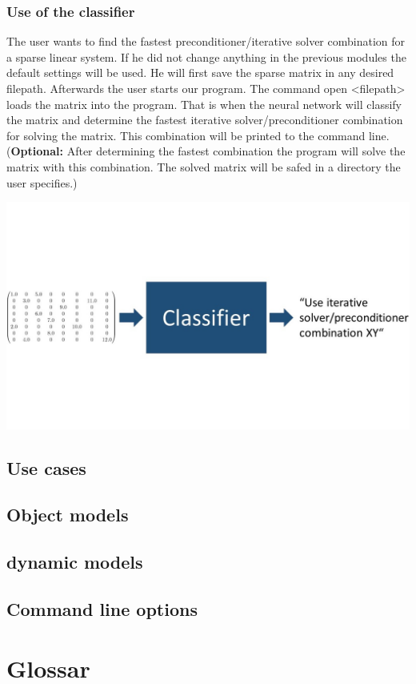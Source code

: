 \documentclass[parskip=full]{scrartcl}
\begin{document}
\subsubsection{Use of the classifier}

The user wants to find the fastest preconditioner/iterative solver combination for a sparse linear system. If he did not change anything in the previous modules the default settings will be used. He will first save the sparse matrix in any desired filepath. Afterwards the user starts our program. The command open <filepath> loads the matrix into the program. That is when the neural network will classify the matrix and determine the fastest iterative solver/preconditioner combination for solving the matrix. This combination will be printed to the command line. (\textbf{Optional:} After determining the fastest combination the program will solve the matrix with this combination. The solved matrix will be safed in a directory the user specifies.)
\begin{center}
\includegraphics[width=\textwidth]{classifier}
\end{center}


\subsection{Use cases}
\subsection{Object models}
\subsection{dynamic models}
\subsection{Command line options}
\clearpage

\section{Glossar}

%
\printnoidxglossaries
\end{document}
